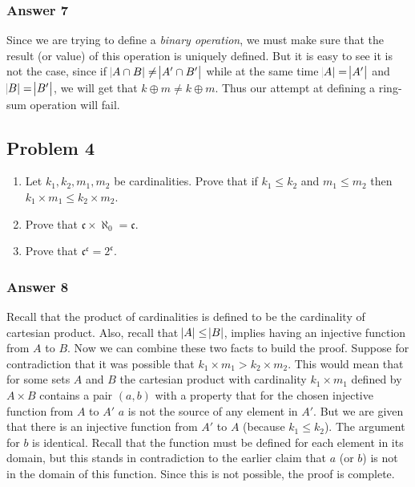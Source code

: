 \documentclass[11pt]{article}
\begin{document}
\subsubsection{Answer 7}
\label{sec-1-3-1}
Since we are trying to define a \emph{binary operation}, we must make sure that the
result (or value) of this operation is uniquely defined.  But it is easy to see
it is not the case, since if $\abs{A \cap B} \neq \abs{A' \cap B'}$
while at the same time $\abs{A} = \abs{A'}$ and $\abs{B} = \abs{B'}$, we will get
that $k \oplus m \neq k \oplus m$.  Thus our attempt at defining a ring-sum
operation will fail.
\subsection{Problem 4}
\label{sec-1-4}
\begin{enumerate}
\item Let $k_1, k_2, m_1, m_2$ be cardinalities. Prove that if $k_1 \leq k_2$ and
      $m_1 \leq m_2$ then $k_1 \times m_1 \leq k_2 \times m_2$.
\item Prove that $\mathfrak{c} \times \aleph_0 = \mathfrak{c}$.
\item Prove that $\mathfrak{c}^{\mathfrak{c}} = 2^{\mathfrak{c}}$.
\end{enumerate}

\subsubsection{Answer 8}
\label{sec-1-4-1}
Recall that the product of cardinalities is defined to be the cardinality of
cartesian product.  Also, recall that $\abs{A} \leq \abs{B}$, implies having
an injective function from $A$ to $B$.  Now we can combine these two facts
to build the proof.  Suppose for contradiction that it was possible that
$k_1 \times m_1 > k_2 \times m_2$.  This would mean that for some sets $A$
and $B$ the cartesian product with cardinality $k_1 \times m_1$ defined by
$A \times B$ contains a pair $(a, b)$ with a property that for the chosen
injective function from $A$ to $A'$ $a$ is not the source of any element in
$A'$. But we are given that there is an injective function from $A'$ to $A$
(because $k_1 \leq k_2$).  The argument for $b$ is identical.  Recall that
the function must be defined for each element in its domain, but this stands
in contradiction to the earlier claim that $a$ (or $b$) is not in the domain
of this function.  Since this is not possible, the proof is complete.
\end{document}
